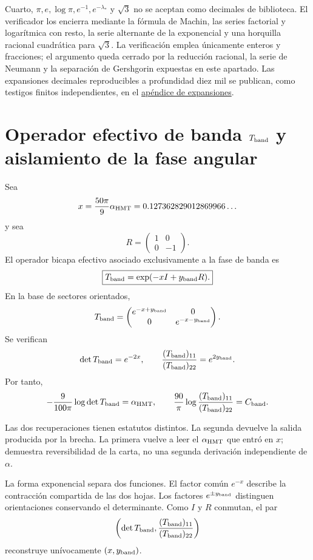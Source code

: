 Cuarto, \(\pi,e,\log\pi,e^{-1},e^{-\lambda_*}\) y \(\sqrt3\) no se
aceptan como decimales de biblioteca. El verificador los encierra mediante
la fórmula de Machin, las series factorial y logarítmica con resto, la
serie alternante de la exponencial y una horquilla racional cuadrática para
\(\sqrt3\). La verificación emplea únicamente enteros y fracciones; el
argumento queda cerrado por la reducción racional, la serie de Neumann y
la separación de Gershgorin expuestas en este apartado. Las expansiones
decimales reproducibles a profundidad diez mil se publican, como testigos
finitos independientes, en el
\hyperref[app:desarrollos-10000-rev9]{apéndice de expansiones}.

\section{Operador efectivo de banda \texorpdfstring{\(T_{\rm band}\)}{Tband} y aislamiento de la fase angular}

Sea
\[
 x=\frac{50\pi}{9}\alpha_{\rm HMT}
 =0.127362829012869966\ldots
\]
y sea
\[
 R=\begin{pmatrix}1&0\\0&-1\end{pmatrix}.
\]
El operador bicapa efectivo asociado exclusivamente a la fase de banda es
\[
 \boxed{T_{\rm band}=\exp(-xI+y_{\rm band}R).}
\]
En la base de sectores orientados,
\[
 T_{\rm band}
 =\begin{pmatrix}
 e^{-x+y_{\rm band}}&0\\
 0&e^{-x-y_{\rm band}}
 \end{pmatrix}.
\]
Se verifican
\[
 \det T_{\rm band}=e^{-2x},
 \qquad
 \frac{(T_{\rm band})_{11}}{(T_{\rm band})_{22}}
 =e^{2y_{\rm band}}.
\]
Por tanto,
\[
 -\frac9{100\pi}\log\det T_{\rm band}=\alpha_{\rm HMT},
 \qquad
 \frac{90}{\pi}
 \log\frac{(T_{\rm band})_{11}}{(T_{\rm band})_{22}}
 =C_{\rm band}.
\]

Las dos recuperaciones tienen estatutos distintos. La segunda devuelve la
salida producida por la brecha. La primera vuelve a leer el
\(\alpha_{\rm HMT}\) que entró en \(x\); demuestra reversibilidad de la
carta, no una segunda derivación independiente de \(\alpha\).

La forma exponencial separa dos funciones. El factor común \(e^{-x}\)
describe la contracción compartida de las dos hojas. Los factores
\(e^{\pm y_{\rm band}}\) distinguen orientaciones conservando el determinante. Como
\(I\) y \(R\) conmutan, el par
\[
 \left(\det T_{\rm band},
 \frac{(T_{\rm band})_{11}}{(T_{\rm band})_{22}}\right)
\]
reconstruye unívocamente \((x,y_{\rm band})\).

